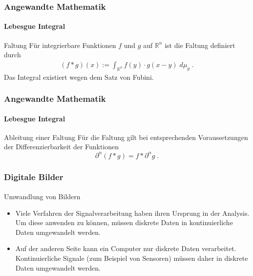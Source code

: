 \documentclass{beamer}
\begin{document}
\begin{frame}
    \frametitle{Angewandte Mathematik}
\framesubtitle{Lebesgue Integral}
\begin{block}{Faltung}
Für integrierbare Funktionen  $f$ und $g$ auf $\mathbb{R}^n$ ist die Faltung definiert durch
\begin{align}
(f * g )(x) := \int_{\mathbb{R}^n}  f(y) \cdot g(x-y) \; d \mu_y  \; .
\end{align}
Das Integral existiert wegen dem Satz von Fubini.
\end{block}
 \end{frame}





\begin{frame}
    \frametitle{Angewandte Mathematik}
\framesubtitle{Lebesgue Integral}
\begin{block}{Ableitung einer Faltung}
Für die Faltung gilt bei entsprechenden Voraussetzungen der Differenzierbarkeit der Funktionen 
$$ \partial^{\alpha} (f  * g) = f * \partial^{\alpha} g \; .$$
\end{block}
 \end{frame}





\begin{frame}
    \frametitle{Digitale Bilder}
\framesubtitle{}
    \begin{block}{Umwandlung von Bildern}
\begin{itemize}
\item Viele Verfahren der  Signalverarbeitung haben ihren Ursprung in der Analysis. Um diese anwenden zu können, müssen diskrete Daten  in kontinuierliche Daten umgewandelt werden.
\item Auf der anderen Seite kann  ein Computer nur diskrete Daten  verarbeitet. Kontinuierliche Signale (zum Beispiel von Sensoren) müssen daher in diskrete Daten umgewandelt werden.
\end{itemize}
\end{block}

 \end{frame}
\end{document}
